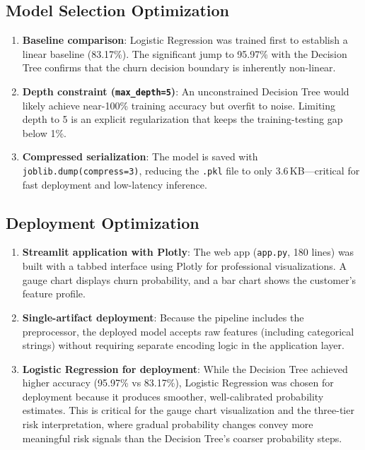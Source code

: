 \documentclass[12pt, a4paper]{article}
\begin{document}
\subsection{Model Selection Optimization}

\begin{enumerate}
    \item \textbf{Baseline comparison}: Logistic Regression was trained first to establish a linear baseline (83.17\%). The significant jump to 95.97\% with the Decision Tree confirms that the churn decision boundary is inherently non-linear.
    \item \textbf{Depth constraint (\texttt{max\_depth=5})}: An unconstrained Decision Tree would likely achieve near-100\% training accuracy but overfit to noise. Limiting depth to 5 is an explicit regularization that keeps the training-testing gap below 1\%.
    \item \textbf{Compressed serialization}: The model is saved with \texttt{joblib.dump(compress=3)}, reducing the \texttt{.pkl} file to only 3.6\,KB---critical for fast deployment and low-latency inference.
\end{enumerate}

\subsection{Deployment Optimization}

\begin{enumerate}
    \item \textbf{Streamlit application with Plotly}: The web app (\texttt{app.py}, 180 lines) was built with a tabbed interface using Plotly for professional visualizations. A gauge chart displays churn probability, and a bar chart shows the customer's feature profile.
    \item \textbf{Single-artifact deployment}: Because the pipeline includes the preprocessor, the deployed model accepts raw features (including categorical strings) without requiring separate encoding logic in the application layer.
    \item \textbf{Logistic Regression for deployment}: While the Decision Tree achieved higher accuracy (95.97\% vs 83.17\%), Logistic Regression was chosen for deployment because it produces smoother, well-calibrated probability estimates. This is critical for the gauge chart visualization and the three-tier risk interpretation, where gradual probability changes convey more meaningful risk signals than the Decision Tree's coarser probability steps.
\end{enumerate}
\end{document}
